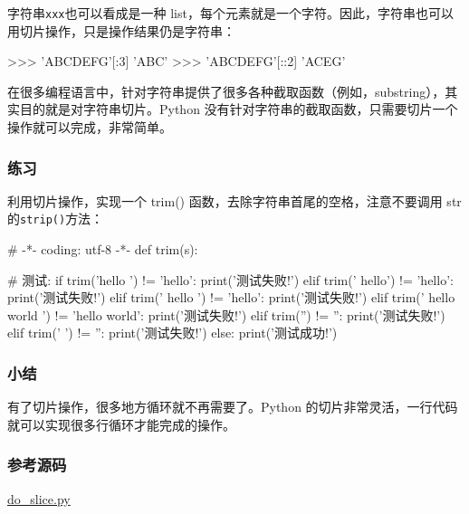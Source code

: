 字符串\texttt{\textquotesingle{}xxx\textquotesingle{}}也可以看成是一种
list，每个元素就是一个字符。因此，字符串也可以用切片操作，只是操作结果仍是字符串：

\begin{pythoncode}
>>> 'ABCDEFG'[:3]
'ABC'
>>> 'ABCDEFG'[::2]
'ACEG'
\end{pythoncode}

在很多编程语言中，针对字符串提供了很多各种截取函数（例如，substring），其实目的就是对字符串切片。Python
没有针对字符串的截取函数，只需要切片一个操作就可以完成，非常简单。

\hypertarget{ux7ec3ux4e60}{%
\subsubsection{练习}\label{ux7ec3ux4e60}}

利用切片操作，实现一个 trim() 函数，去除字符串首尾的空格，注意不要调用
str 的\texttt{strip()}方法：

\begin{pythoncode}
# -*- coding: utf-8 -*-
def trim(s):
\end{pythoncode}

\begin{pythoncode}
# 测试:
if trim('hello  ') != 'hello':
    print('测试失败!')
elif trim('  hello') != 'hello':
    print('测试失败!')
elif trim('  hello  ') != 'hello':
    print('测试失败!')
elif trim('  hello  world  ') != 'hello  world':
    print('测试失败!')
elif trim('') != '':
    print('测试失败!')
elif trim('    ') != '':
    print('测试失败!')
else:
    print('测试成功!')
\end{pythoncode}

\hypertarget{ux5c0fux7ed3}{%
\subsubsection{小结}\label{ux5c0fux7ed3}}

有了切片操作，很多地方循环就不再需要了。Python
的切片非常灵活，一行代码就可以实现很多行循环才能完成的操作。

\hypertarget{ux53c2ux8003ux6e90ux7801}{%
\subsubsection{参考源码}\label{ux53c2ux8003ux6e90ux7801}}

\href{https://github.com/michaelliao/learn-python3/blob/master/samples/advance/do_slice.py}{do\_slice.py}

